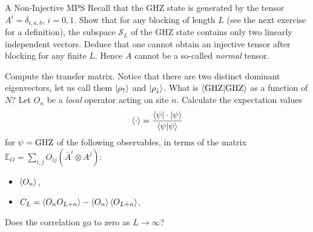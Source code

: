 \documentclass[a4paper,10pt,twoside]{article}
\theoremstyle{modern}
\begin{document}
\begin{section}{A Non-Injective MPS}
Recall that  the GHZ state is generated by the tensor $A^i = \delta_{i,a,b}$, $i = 0,1$.
Show that for any blocking of length $L$ (see the next exercise for a definition), the subspace $\mathcal{S}_L$ of the GHZ state contains only two linearly independent vectors.
Deduce that one cannot obtain an injective tensor after blocking for any finite $L$. 
Hence $A$ cannot be a so-called \emph{normal} tensor.


Compute the transfer matrix.
Notice that there are two distinct dominant eigenvectors, let us call them $\ket{\rho_\uparrow}$ and $\ket{\rho_\downarrow}$.
What is $\braket{{\rm GHZ} | {\rm GHZ}}$ as a function of $N$?
Let $O_n$ be a \emph{local} operator acting on site $n$.
Calculate the expectation values 
\[
  \braket{\cdot} = \frac{\braket{\psi | \cdot | \psi}}{\braket{\psi|\psi}}
\]
for $\psi = {\rm GHZ}$ of the following observables, in terms of the matrix $\mathbb{E}_O = \sum_{i,j} O_{ij} (\bar{A}^i \otimes A^j)$:
\begin{itemize}
  \item $\braket{O_n}$,
  \item $C_L = \braket{O_n O_{L+n}} - \braket{O_n}\braket{O_{L+n}} $,
\end{itemize}
Does the correlation go to zero as $L \to \infty$?
\end{section}
\end{document}
